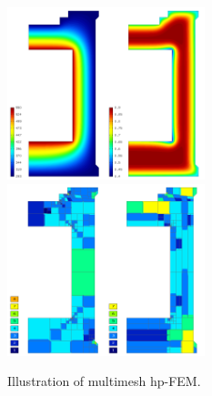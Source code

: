 \documentclass[12pt]{elsarticle}
\begin{document}
\begin{figure}[H]
\centering
\includegraphics[height=5cm]{img/hermes_hm_sol.png}
\hspace{10mm}
\includegraphics[height=5cm]{img/hermes_hm_mesh.png}
\caption{Illustration of multimesh hp-FEM.}
\label{fig:hermes_hm}
\end{figure}






\end{document}

